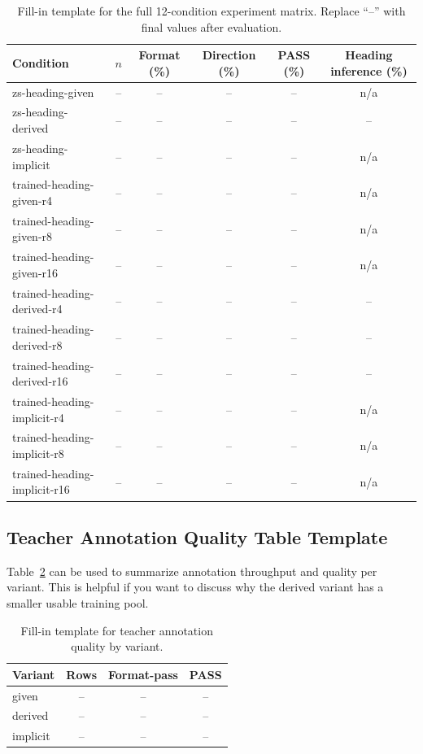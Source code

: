 \documentclass[10pt,twocolumn,letterpaper]{article}
\begin{document}
\begin{table}[t]
\centering
\small
\begin{tabular}{lccccc}
\toprule
Condition & $n$ & Format (\%) & Direction (\%) & PASS (\%) & Heading inference (\%) \\
\midrule
zs-heading-given & -- & -- & -- & -- & n/a \\
zs-heading-derived & -- & -- & -- & -- & -- \\
zs-heading-implicit & -- & -- & -- & -- & n/a \\
trained-heading-given-r4 & -- & -- & -- & -- & n/a \\
trained-heading-given-r8 & -- & -- & -- & -- & n/a \\
trained-heading-given-r16 & -- & -- & -- & -- & n/a \\
trained-heading-derived-r4 & -- & -- & -- & -- & -- \\
trained-heading-derived-r8 & -- & -- & -- & -- & -- \\
trained-heading-derived-r16 & -- & -- & -- & -- & -- \\
trained-heading-implicit-r4 & -- & -- & -- & -- & n/a \\
trained-heading-implicit-r8 & -- & -- & -- & -- & n/a \\
trained-heading-implicit-r16 & -- & -- & -- & -- & n/a \\
\bottomrule
\end{tabular}
\caption{Fill-in template for the full 12-condition experiment matrix. Replace ``--'' with final values after evaluation.}
\label{tab:full_results_template}
\end{table}

\subsection{Teacher Annotation Quality Table Template}
Table~\ref{tab:teacher_quality_template} can be used to summarize annotation throughput and quality per variant. This is helpful if you want to discuss why the derived variant has a smaller usable training pool.

\begin{table}[t]
\centering
\small
\begin{tabular}{lccc}
\toprule
Variant & Rows & Format-pass & PASS \\
\midrule
given & -- & -- & -- \\
derived & -- & -- & -- \\
implicit & -- & -- & -- \\
\bottomrule
\end{tabular}
\caption{Fill-in template for teacher annotation quality by variant.}
\label{tab:teacher_quality_template}
\end{table}
\end{document}
